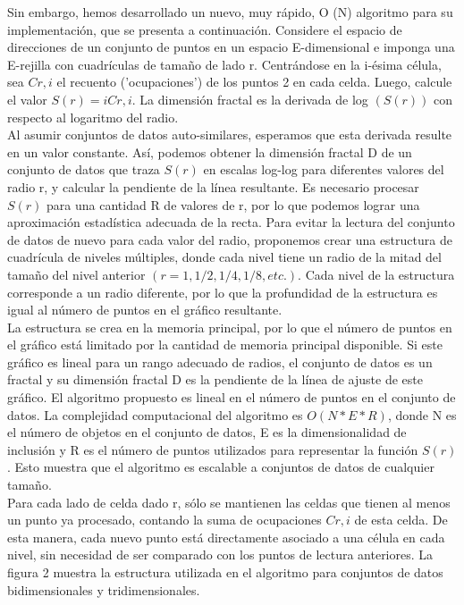 Sin embargo, hemos desarrollado un nuevo, muy rápido, O (N) algoritmo para su implementación, que se presenta a continuación. Considere el espacio de direcciones de un conjunto de puntos en un espacio E-dimensional e imponga una E-rejilla con cuadrículas de tamaño de lado r. Centrándose en la i-ésima célula, sea $C r, i$ el recuento ('ocupaciones') de los puntos 2 en cada celda. Luego, calcule el valor $S (r) = i C r, i$. La dimensión fractal es la derivada de log $(S (r))$ con respecto al logaritmo del radio. \\

Al asumir conjuntos de datos auto-similares, esperamos que esta derivada resulte en un valor constante. Así, podemos obtener la dimensión fractal D de un conjunto de datos que traza $S (r)$ en escalas log-log para diferentes valores del radio r, y calcular la pendiente de la línea resultante. Es necesario procesar $S (r)$ para una cantidad R de valores de r, por lo que podemos lograr una aproximación estadística adecuada de la recta. Para evitar la lectura del conjunto de datos de nuevo para cada valor del radio, proponemos crear una estructura de cuadrícula de niveles múltiples, donde cada nivel tiene un radio de la mitad del tamaño del nivel anterior $(r = 1, 1/2, 1 / 4, 1/8, etc.)$. Cada nivel de la estructura corresponde a un radio diferente, por lo que la profundidad de la estructura es igual al número de puntos en el gráfico resultante. \\

La estructura se crea en la memoria principal, por lo que el número de puntos en el gráfico está limitado por la cantidad de memoria principal disponible. Si este gráfico es lineal para un rango adecuado de radios, el conjunto de datos es un fractal y su dimensión fractal D es la pendiente de la línea de ajuste de este gráfico. El algoritmo propuesto es lineal en el número de puntos en el conjunto de datos. La complejidad computacional del algoritmo es $O (N * E * R)$, donde N es el número de objetos en el conjunto de datos, E es la dimensionalidad de inclusión y R es el número de puntos utilizados para representar la función $S (r)$. Esto muestra que el algoritmo es escalable a conjuntos de datos de cualquier tamaño.\\

Para cada lado de celda dado r, sólo se mantienen las celdas que tienen al menos un punto ya procesado, contando la suma de ocupaciones $C r, i $ de esta celda. De esta manera, cada nuevo punto está directamente asociado a una célula en cada nivel, sin necesidad de ser comparado con los puntos de lectura anteriores. La figura 2 muestra la estructura utilizada en el algoritmo para conjuntos de datos bidimensionales y tridimensionales.\\


